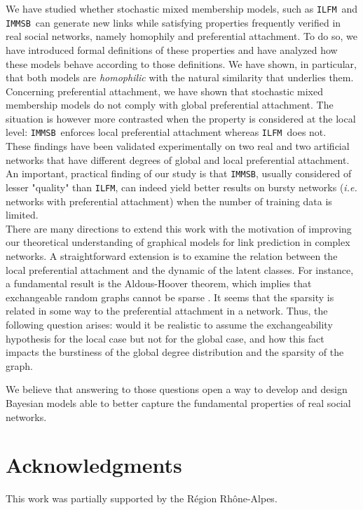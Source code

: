\documentclass[conference]{IEEEtran}
\newcommand{\ifm}{\texttt{ILFM}}
\newcommand{\imb}{\texttt{IMMSB}}
\begin{document}
We have studied whether stochastic mixed membership models, such as \ifm\ and \imb\, can generate new links while satisfying properties frequently verified in real  social networks, namely homophily and preferential attachment. To do so, we have introduced formal definitions of these properties and have analyzed how these models behave according to those definitions. We have shown, in particular, that both models are \textit{homophilic} with the natural similarity that underlies them. Concerning preferential attachment, we have shown that stochastic mixed membership models do not comply with global preferential attachment. The situation is however more contrasted when the property is considered at the local level: \imb\ enforces local preferential attachment whereas \ifm\ does not.~\\

These findings have been validated experimentally on two real and two artificial networks that have different degrees of global and local preferential attachment. An important, practical finding of our study is that \imb, usually considered of lesser "quality" than \ifm, can indeed yield better results on bursty networks (\textit{i.e.} networks with preferential attachment) when the number of training data is limited.~\\

There are many directions to extend this work with the motivation of improving our theoretical understanding of graphical models for link prediction in complex networks. A straightforward extension is to examine the relation between the local preferential attachment and the dynamic of the latent classes.  
For instance, a fundamental result is the Aldous-Hoover theorem, which implies that exchangeable random graphs cannot be sparse \cite{orbanz2015bayesian}. It seems that the sparsity is related in some way to the preferential attachment in a network. Thus, the following question arises: would it be realistic to assume the exchangeability hypothesis for the local case but not for the global case, and how this fact impacts the burstiness of the global degree distribution and the sparsity of the graph.

We believe that answering to those questions open a way to develop and design Bayesian models able to better capture the fundamental properties of  real social networks.

\section{Acknowledgments}
This work was partially supported  by the Région Rhône-Alpes. 

~\\



\end{document}
